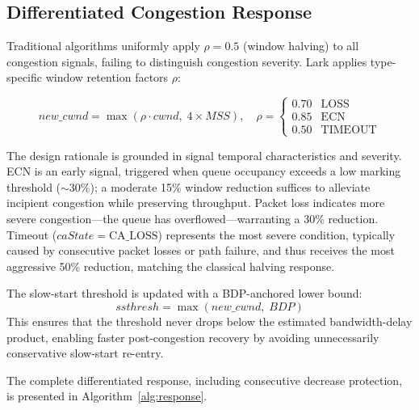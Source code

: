 \documentclass[10pt,twocolumn]{article}
\begin{document}
\subsection{Differentiated Congestion Response}

Traditional algorithms uniformly apply $\rho = 0.5$ (window halving) to all congestion signals, failing to distinguish congestion severity. Lark applies type-specific window retention factors $\rho$:

\begin{equation}
\label{eq:retention}
new\_cwnd = \max(\rho \cdot cwnd, \; 4 \times MSS), \quad
\rho = \begin{cases}
0.70 & \text{LOSS} \\
0.85 & \text{ECN} \\
0.50 & \text{TIMEOUT}
\end{cases}
\end{equation}

The design rationale is grounded in signal temporal characteristics and severity. ECN is an early signal, triggered when queue occupancy exceeds a low marking threshold ($\sim$30\%); a moderate 15\% window reduction suffices to alleviate incipient congestion while preserving throughput. Packet loss indicates more severe congestion---the queue has overflowed---warranting a 30\% reduction. Timeout ($caState = \text{CA\_LOSS}$) represents the most severe condition, typically caused by consecutive packet losses or path failure, and thus receives the most aggressive 50\% reduction, matching the classical halving response.

The slow-start threshold is updated with a BDP-anchored lower bound:
\begin{equation}
\label{eq:ssthresh}
ssthresh = \max(new\_cwnd, \; BDP)
\end{equation}
This ensures that the threshold never drops below the estimated bandwidth-delay product, enabling faster post-congestion recovery by avoiding unnecessarily conservative slow-start re-entry.

The complete differentiated response, including consecutive decrease protection, is presented in Algorithm~\ref{alg:response}.
\end{document}
